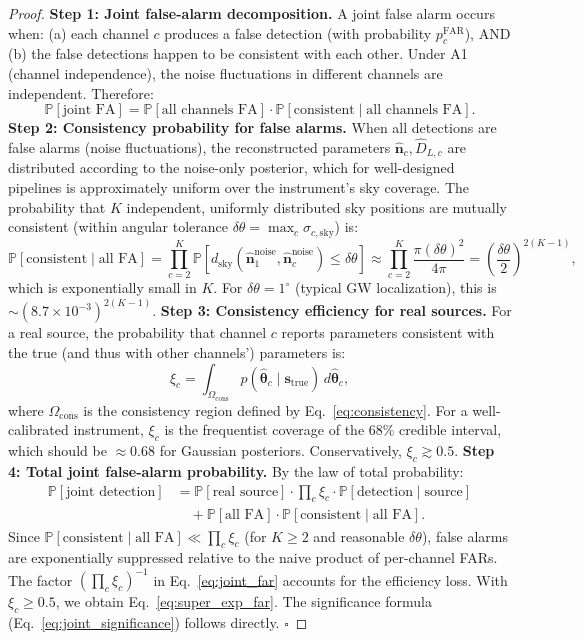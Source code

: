 \documentclass[11pt,a4paper]{article}
\theoremstyle{definition}
\newcommand{\Pbb}{\mathbb{P}}
\begin{document}
\begin{proof}
\textbf{Step 1: Joint false-alarm decomposition.}
A joint false alarm occurs when: (a) each channel $c$ produces a false detection (with probability $p_c^{\mathrm{FAR}}$), AND (b) the false detections happen to be consistent with each other. Under A1 (channel independence), the noise fluctuations in different channels are independent. Therefore:
\begin{equation}
\Pbb[\text{joint FA}] = \Pbb[\text{all channels FA}] \cdot \Pbb[\text{consistent} \mid \text{all channels FA}].
\end{equation}
\textbf{Step 2: Consistency probability for false alarms.}
When all detections are false alarms (noise fluctuations), the reconstructed parameters $\hat{\mathbf{n}}_c, \hat{D}_{L,c}$ are distributed according to the noise-only posterior, which for well-designed pipelines is approximately uniform over the instrument's sky coverage. The probability that $K$ independent, uniformly distributed sky positions are mutually consistent (within angular tolerance $\delta\theta = \max_c \sigma_{c,\mathrm{sky}}$) is:
\begin{equation}
\Pbb[\text{consistent} \mid \text{all FA}] = \prod_{c=2}^K \Pbb[d_{\mathrm{sky}}(\hat{\mathbf{n}}_1^{\mathrm{noise}}, \hat{\mathbf{n}}_c^{\mathrm{noise}}) \leq \delta\theta] \approx \prod_{c=2}^K \frac{\pi (\delta\theta)^2}{4\pi} = \left(\frac{\delta\theta}{2}\right)^{2(K-1)},
\end{equation}
which is exponentially small in $K$. For $\delta\theta = 1^\circ$ (typical GW localization), this is $\sim (8.7 \times 10^{-3})^{2(K-1)}$.
\textbf{Step 3: Consistency efficiency for real sources.}
For a real source, the probability that channel $c$ reports parameters consistent with the true (and thus with other channels') parameters is:
\begin{equation}
\xi_c = \int_{\Omega_{\mathrm{cons}}} p(\hat{\boldsymbol{\theta}}_c \mid \mathbf{s}_{\mathrm{true}}) \, d\hat{\boldsymbol{\theta}}_c,
\end{equation}
where $\Omega_{\mathrm{cons}}$ is the consistency region defined by Eq.~\ref{eq:consistency}. For a well-calibrated instrument, $\xi_c$ is the frequentist coverage of the 68\% credible interval, which should be $\approx 0.68$ for Gaussian posteriors. Conservatively, $\xi_c \gtrsim 0.5$.
\textbf{Step 4: Total joint false-alarm probability.}
By the law of total probability:
\begin{align}
\Pbb[\text{joint detection}] &= \Pbb[\text{real source}] \cdot \prod_{c} \xi_c \cdot \Pbb[\text{detection} \mid \text{source}] \\
&\quad + \Pbb[\text{all FA}] \cdot \Pbb[\text{consistent} \mid \text{all FA}] \nonumber.
\end{align}
Since $\Pbb[\text{consistent} \mid \text{all FA}] \ll \prod_c \xi_c$ (for $K \geq 2$ and reasonable $\delta\theta$), false alarms are exponentially suppressed relative to the naive product of per-channel FARs. The factor $(\prod_c \xi_c)^{-1}$ in Eq.~\ref{eq:joint_far} accounts for the efficiency loss. With $\xi_c \geq 0.5$, we obtain Eq.~\ref{eq:super_exp_far}. The significance formula (Eq.~\ref{eq:joint_significance}) follows directly. $\square$
\end{proof}
\end{document}
